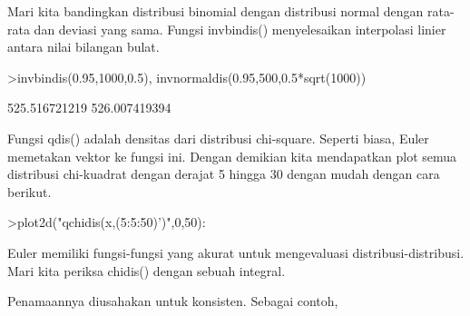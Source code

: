 \documentclass[a4paper,10pt]{article}
\begin{document}
\begin{eulernotebook}
\begin{eulercomment}
\begin{eulercomment}
\begin{eulercomment}
\begin{eulercomment}
\begin{eulercomment}
\begin{eulercomment}
\begin{eulercomment}
\begin{eulercomment}
\begin{eulercomment}
\begin{eulercomment}
\begin{eulercomment}
\begin{eulercomment}
\begin{eulercomment}
\begin{eulercomment}
\begin{eulercomment}
\begin{eulercomment}
\begin{eulercomment}
\begin{eulercomment}
\begin{eulercomment}
\begin{eulercomment}
\begin{eulercomment}
\begin{eulercomment}
\begin{eulercomment}
\begin{eulercomment}
\begin{eulercomment}
\begin{eulercomment}
\begin{eulercomment}
\begin{eulercomment}
\begin{eulercomment}
\begin{eulercomment}
\begin{eulercomment}
\begin{eulercomment}
\begin{eulercomment}
\begin{eulercomment}
\begin{eulercomment}
\begin{eulercomment}
\begin{eulercomment}
\begin{eulercomment}
\begin{eulercomment}
\begin{eulercomment}
\begin{eulercomment}
\begin{eulercomment}
\begin{eulercomment}
\begin{eulercomment}
\begin{euleroutput}
\end{euleroutput}
\begin{eulercomment}
Mari kita bandingkan distribusi binomial dengan distribusi normal
dengan rata-rata dan deviasi yang sama. Fungsi invbindis()
menyelesaikan interpolasi linier antara nilai bilangan bulat.
\end{eulercomment}
\begin{eulerprompt}
>invbindis(0.95,1000,0.5), invnormaldis(0.95,500,0.5*sqrt(1000))
\end{eulerprompt}
\begin{euleroutput}
  525.516721219
  526.007419394
\end{euleroutput}
\begin{eulercomment}
Fungsi qdis() adalah densitas dari distribusi chi-square. Seperti
biasa, Euler memetakan vektor ke fungsi ini. Dengan demikian kita
mendapatkan plot semua distribusi chi-kuadrat dengan derajat 5 hingga
30 dengan mudah dengan cara berikut.
\end{eulercomment}
\begin{eulerprompt}
>plot2d("qchidis(x,(5:5:50)')",0,50):
\end{eulerprompt}
\begin{eulercomment}
Euler memiliki fungsi-fungsi yang akurat untuk mengevaluasi
distribusi-distribusi. Mari kita periksa chidis() dengan sebuah
integral.

Penamaannya diusahakan untuk konsisten. Sebagai contoh,


\end{eulercomment}
\end{eulercomment}
\end{eulercomment}
\end{eulercomment}
\end{eulercomment}
\end{eulercomment}
\end{eulercomment}
\end{eulercomment}
\end{eulercomment}
\end{eulercomment}
\end{eulercomment}
\end{eulercomment}
\end{eulercomment}
\end{eulercomment}
\end{eulercomment}
\end{eulercomment}
\end{eulercomment}
\end{eulercomment}
\end{eulercomment}
\end{eulercomment}
\end{eulercomment}
\end{eulercomment}
\end{eulercomment}
\end{eulercomment}
\end{eulercomment}
\end{eulercomment}
\end{eulercomment}
\end{eulercomment}
\end{eulercomment}
\end{eulercomment}
\end{eulercomment}
\end{eulercomment}
\end{eulercomment}
\end{eulercomment}
\end{eulercomment}
\end{eulercomment}
\end{eulercomment}
\end{eulercomment}
\end{eulercomment}
\end{eulercomment}
\end{eulercomment}
\end{eulercomment}
\end{eulercomment}
\end{eulercomment}
\end{eulercomment}
\end{eulernotebook}
\end{document}
